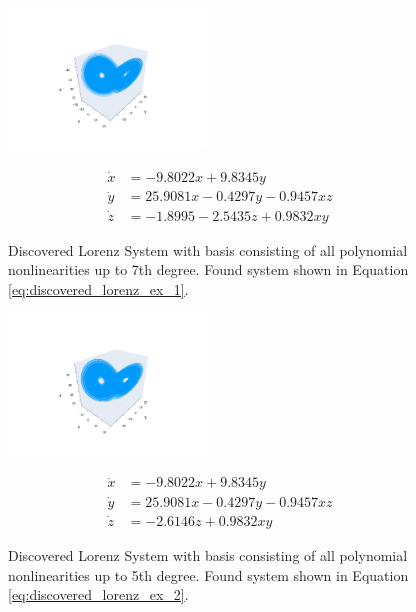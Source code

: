 \documentclass[10pt]{paper}
\begin{document}
\begin{figure}[H]
	\caption{Discovered Lorenz System with basis consisting of all polynomial nonlinearities up to 7th degree. Found system shown in Equation \ref{eq:discovered_lorenz_ex_1}.}
	\label{fig:found_lorenz_ex_1}

	\centering 
	\includegraphics[width = 0.47\textwidth, trim={4.3cm, 1.9cm, 4.3cm, 3.5cm}, clip]{lorenz_found_basis_ex_1.pdf}

	\begin{equation}\label{eq:discovered_lorenz_ex_1}
		\begin{split}
			\dot x &= -9.8022x + 9.8345y \\ 
			\dot y &= 25.9081x -0.4297y -0.9457xz \\
			\dot z &= -1.8995 -2.5435z + 0.9832xy
		\end{split}
	\end{equation}
\end{figure}
\begin{figure}[H]
	\caption{Discovered Lorenz System with basis consisting of all polynomial nonlinearities up to 5th degree. Found system shown in Equation \ref{eq:discovered_lorenz_ex_2}.}
	\label{fig:found_lorenz_ex_2}

	\centering 
	\includegraphics[width = 0.47\textwidth, trim={4.3cm, 1.9cm, 4.3cm, 3.5cm}, clip]{lorenz_found_basis_ex_2.pdf}

	\begin{equation}\label{eq:discovered_lorenz_ex_2}
		\begin{split}
			\dot x &= -9.8022x + 9.8345y \\ 
			\dot y &= 25.9081x  -0.4297y  -0.9457xz \\
			\dot z &= -2.6146z + 0.9832xy
		\end{split}
	\end{equation}
\end{figure}
\end{document}
